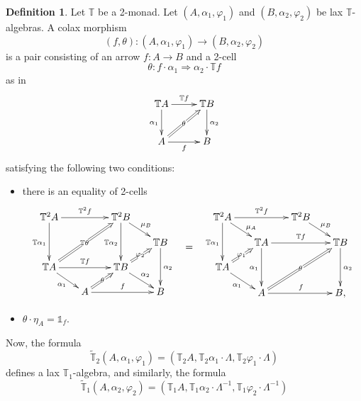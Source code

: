 \documentclass[12pt,leqno]{amsart}
\theoremstyle{definition}
\newtheorem{definition}[theorem]{Definition}
\def\T{\mathbb{T}}
\def\id{{\mathbb 1}}
\newcommand{\4}{\texttt{4}}
\renewcommand{\phi}{\varphi}
\begin{document}
\begin{definition}\label{definition:colax_morphism_in_text}Let $\T$ be a 2-monad. 
Let $(A,\alpha_1,\phi_1)$ and $(B,\alpha_2,\phi_2)$ be lax
$\T$-algebras. A colax morphism
\[
(f,\theta)\colon (A,\alpha_1,\phi_1)\to (B,\alpha_2,\phi_2)
\] 
is a pair consisting of an arrow $f\colon A\to B$ and a 2-cell
\[
\theta\colon f\cdot \alpha_1 \Rightarrow \alpha_2\cdot \T f
\]
as in
\[
\xymatrix@R=2.5em@C=2.5em{
\T A \ar[r]^{\T f} \ar[d]_{\alpha_1} 
& \T B\ar[d]^{\alpha_2} \ar@{<=}[dl]|{\theta\rule{.1em}{0pt}}
\\
A \ar[r]_{f} & B
}
\]
satisfying the following two conditions:
\begin{itemize}[topsep=0pt, partopsep=0pt, itemsep=0pt, itemindent=-1em]
\item[(i)]
there is an equality of 2-cells
\begin{equation}
    \label{equation:colax-lax-cube}
\xymatrix@R=1.2em@C=1.7em{
\T^2 A \ar[rr]^{\T^2 f}\ar[dd]_{\T \alpha_1} && \T^2 B \ar@{<=}[lldd]|{\T\theta\rule{.1em}{0pt}}\ar[rd]^{\mu_B} \ar[dd]_{\T \alpha_2}
\\
&&& \T B \ar[dd]^{\alpha_2} \ar@{<=}[ld]|{\phi_2\rule{.1em}{0pt}}
\\
\T A  \ar[rr]^{\T f} \ar[rd]_{\alpha_1} && \T B
\ar@{<=}[ld]|{\theta\rule{.1em}{0pt}}
\ar[dr]^{\alpha_2}
\\
&A \ar[rr]^f && B
}
\hskip 1em
\raisebox{-3em}{$=$} \hskip 1em
\xymatrix@R=1.2em@C=1.7em{
\T^2 A \ar[rr]^{\T^2 f}\ar[dd]_{{\T \alpha_1}} \ar[rd]^(.6){\mu_A}   && 
\T^2 B \ar[rd]^{\mu_B} 
\\
&\T A \ar@{<=}[ld]|{\phi_1\rule{.1em}{0pt}} \ar[rr]^{\T f}   \ar[dd]_{\alpha_1}&& \T B \ar[dd]^{\alpha_2} 
\ar@{<=}[lldd]|{\theta\rule{.1em}{0pt}}
\\
\T A \ar[rd]_{\alpha_1} &&
\\
&A \ar[rr]^f && B,
}
\end{equation}
\item[(ii)] 
$\theta\cdot\eta_A=\id_f$.
\end{itemize} 
\end{definition}
Now, the formula
\begin{equation}\label{equation:lifted_T_2_lax_lax}
\widetilde{\T}_2(A, \alpha_1,\phi_1)=(\T_2 A,\T_2\alpha_1\cdot\Lambda, \T_2\phi_1\cdot\Lambda)
\end{equation}
defines a lax $\T_1$-algebra, and similarly, the formula 
\begin{equation}\label{equation:lifted_T_1_lax_lax}
\widetilde{\T}_1(A, \alpha_2,\phi_2)=(\T_1 A,\T_1\alpha_2\cdot\Lambda^{-1}, \T_1\phi_2\cdot\Lambda^{-1})
\end{equation}
\end{document}
